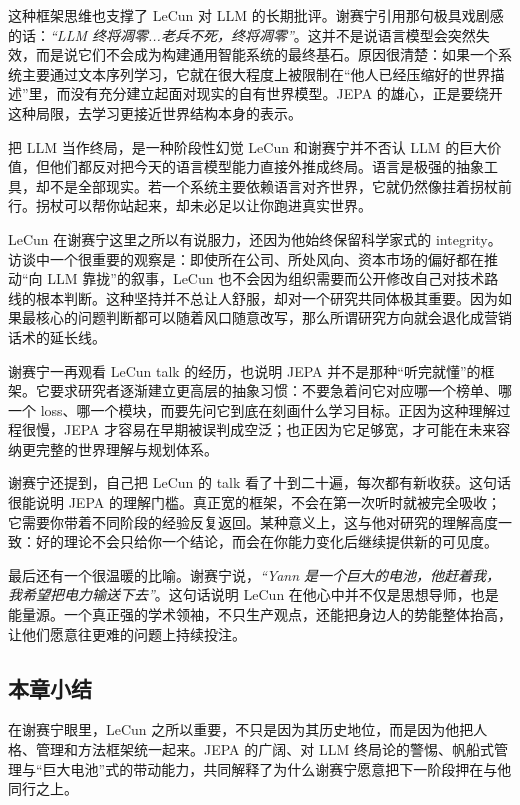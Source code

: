 这种框架思维也支撑了 LeCun 对 LLM 的长期批评。谢赛宁引用那句极具戏剧感的话：\textit{``LLM 终将凋零...老兵不死，终将凋零''}。这并不是说语言模型会突然失效，而是说它们不会成为构建通用智能系统的最终基石。原因很清楚：如果一个系统主要通过文本序列学习，它就在很大程度上被限制在“他人已经压缩好的世界描述”里，而没有充分建立起面对现实的自有世界模型。JEPA 的雄心，正是要绕开这种局限，去学习更接近世界结构本身的表示。

\begin{warningbox}{把 LLM 当作终局，是一种阶段性幻觉}
LeCun 和谢赛宁并不否认 LLM 的巨大价值，但他们都反对把今天的语言模型能力直接外推成终局。语言是极强的抽象工具，却不是全部现实。若一个系统主要依赖语言对齐世界，它就仍然像拄着拐杖前行。拐杖可以帮你站起来，却未必足以让你跑进真实世界。
\end{warningbox}

LeCun 在谢赛宁这里之所以有说服力，还因为他始终保留科学家式的 integrity。访谈中一个很重要的观察是：即使所在公司、所处风向、资本市场的偏好都在推动“向 LLM 靠拢”的叙事，LeCun 也不会因为组织需要而公开修改自己对技术路线的根本判断。这种坚持并不总让人舒服，却对一个研究共同体极其重要。因为如果最核心的问题判断都可以随着风口随意改写，那么所谓研究方向就会退化成营销话术的延长线。

谢赛宁一再观看 LeCun talk 的经历，也说明 JEPA 并不是那种“听完就懂”的框架。它要求研究者逐渐建立更高层的抽象习惯：不要急着问它对应哪一个榜单、哪一个 loss、哪一个模块，而要先问它到底在刻画什么学习目标。正因为这种理解过程很慢，JEPA 才容易在早期被误判成空泛；也正因为它足够宽，才可能在未来容纳更完整的世界理解与规划体系。

谢赛宁还提到，自己把 LeCun 的 talk 看了十到二十遍，每次都有新收获。这句话很能说明 JEPA 的理解门槛。真正宽的框架，不会在第一次听时就被完全吸收；它需要你带着不同阶段的经验反复返回。某种意义上，这与他对研究的理解高度一致：好的理论不会只给你一个结论，而会在你能力变化后继续提供新的可见度。

最后还有一个很温暖的比喻。谢赛宁说，\textit{``Yann 是一个巨大的电池，他赶着我，我希望把电力输送下去''}。这句话说明 LeCun 在他心中并不仅是思想导师，也是能量源。一个真正强的学术领袖，不只生产观点，还能把身边人的势能整体抬高，让他们愿意往更难的问题上持续投注。

\subsection{本章小结}

在谢赛宁眼里，LeCun 之所以重要，不只是因为其历史地位，而是因为他把人格、管理和方法框架统一起来。JEPA 的广阔、对 LLM 终局论的警惕、帆船式管理与“巨大电池”式的带动能力，共同解释了为什么谢赛宁愿意把下一阶段押在与他同行之上。

